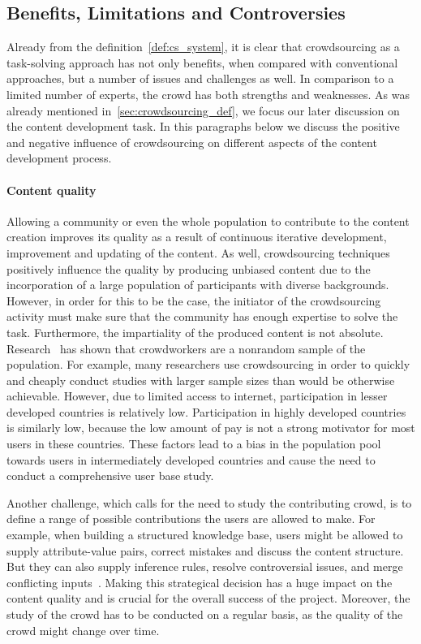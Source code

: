 \documentclass[PhD, Submit, ngerman,UKenglish,table]{scrbook}
\begin{document}
\subsection{Benefits, Limitations and Controversies}

Already from the definition~\autoref{def:cs_system}, it is clear that crowdsourcing as a task-solving approach has not only benefits, when compared with conventional approaches, but a number of issues and challenges as well.
In comparison to a limited number of experts, the crowd has both strengths and weaknesses.
As was already mentioned in~\autoref{sec:crowdsourcing_def}, we focus our later discussion on the content development task.
In this paragraphs below we discuss the positive and negative influence of crowdsourcing on different aspects of the content development process.

\paragraph{Content quality}

Allowing a community or even the whole population to contribute to the content creation improves its quality as a result of continuous iterative development, improvement and updating of the content.
As well, crowdsourcing techniques positively influence the quality by producing unbiased content due to the incorporation of a large population of participants with diverse backgrounds. 
However, in order for this to be the case, the initiator of the crowdsourcing activity must make sure that the community has enough expertise to solve the task.
Furthermore, the impartiality of the produced content is not absolute.
Research~\cite{hirth2011human} has shown that crowdworkers are a nonrandom sample of the population.
For example, many researchers use crowdsourcing in order to quickly and cheaply conduct studies with larger sample sizes than would be otherwise achievable.
However, due to limited access to internet, participation in lesser developed countries is relatively low.
Participation in highly developed countries is similarly low, because the low amount of pay is not a strong motivator for most users in these countries.
These factors lead to a bias in the population pool towards users in intermediately developed countries and cause the need to conduct a comprehensive user base study.

Another challenge, which calls for the need to study the contributing crowd, is to define a range of possible contributions the users are allowed to make. 
For example, when building a structured knowledge base, users might be allowed to supply attribute-value pairs, correct mistakes and discuss the content structure.
But they can also supply inference rules, resolve controversial issues, and merge conflicting inputs~\cite{richardson2003building}.
Making this strategical decision has a huge impact on the content quality and is crucial for the overall success of the project.
Moreover, the study of the crowd has to be conducted on a regular basis, as the quality of the crowd might change over time.
\end{document}
